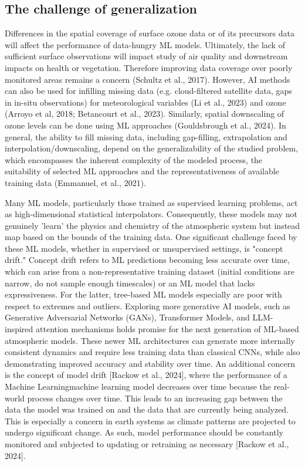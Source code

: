 \documentclass[gmd, manuscript]{copernicus}
\begin{document}
\subsection{The challenge of generalization}
Differences in the spatial coverage of surface ozone data or of its precursors data will affect the performance of data-hungry ML models. Ultimately, the lack of sufficient surface observations will impact study of air quality and downstream impacts on health or vegetation. Therefore improving data coverage over poorly monitored areas remains a concern (Schultz et al., 2017). However,  AI methods  can also be used for infilling missing data (e.g. cloud-filtered satellite data, gaps in in-situ observations) for meteorological variables (Li et al., 2023) and ozone (Arroyo et al, 2018; Betancourt et al., 2023). Similarly, spatial downscaling of ozone levels can be done using ML approaches (Gouldsbrough et al., 2024). In general, the ability to fill missing data, including gap-filling, extrapolation and interpolation/downscaling,  depend on the generalizability of the studied problem, which encompasses the inherent complexity of the modeled process, the suitability of selected ML approaches and the representativeness of available training data (Emmanuel, et al., 2021). 

Many ML models, particularly those trained as supervised learning problems, act as high-dimensional statistical interpolators. Consequently, these models may not genuinely 'learn' the physics and chemistry of the atmospheric system but instead map based on the bounds of the training data. One significant challenge faced by these ML models, whether in supervised or unsupervised settings, is "concept drift." Concept drift refers to ML predictions becoming less accurate over time, which can arise from a non-representative training dataset (initial conditions are narrow, do not sample enough timescales) or an ML model that lacks expressiveness. For the latter, tree-based ML models especially are poor with respect to extremes and outliers. Exploring more generative AI models, such as Generative Adversarial Networks (GANs), Transformer Models, and LLM-inspired attention mechanisms holds promise for the next generation of ML-based atmospheric models. These newer ML architectures can generate more internally consistent dynamics and require less training data than classical CNNs, while also demonstrating improved accuracy and stability over time.   An additional concern is the concept of model drift [Rackow et al., 2024], where the performance of a Machine Learningmachine learning model decreases over time because the real-world process changes over time. This leads to an increasing gap between the data the model was trained on and the data that are currently being analyzed. This is especially a concern in earth systems as climate patterns are projected to undergo significant change. As such, model performance should be constantly monitored and subjected to updating or retraining as necessary [Rackow et al., 2024].
\end{document}
